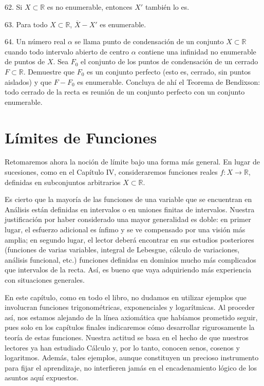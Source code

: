 \documentclass[12pt,oneside]{book}
\begin{document}
62. Si \(X \subset \mathbb{R}\) es no enumerable, entonces \(X'\) también lo es.

63. Para todo \(X \subset \mathbb{R}\), \(\overline{X} - X'\) es enumerable.

64. Un número real \(\alpha\) se llama punto de condensación de un conjunto \(X \subset \mathbb{R}\) cuando todo intervalo abierto de centro \(\alpha\) contiene una infinidad no enumerable de puntos de \(X\). Sea \(F_0\) el conjunto de los puntos de condensación de un cerrado \(F \subset \mathbb{R}\). Demuestre que \(F_0\) es un conjunto perfecto (esto es, cerrado, sin puntos aislados) y que \(F - F_0\) es enumerable. Concluya de ahí el Teorema de Bendixson: todo cerrado de la recta es reunión de un conjunto perfecto con un conjunto enumerable.

\newpage

\chapter{Límites de Funciones}

Retomaremos ahora la noción de límite bajo una forma más general. En lugar de sucesiones, como en el Capítulo IV, consideraremos funciones reales \( f: X \to \mathbb{R} \), definidas en subconjuntos arbitrarios \( X \subset \mathbb{R} \).

Es cierto que la mayoría de las funciones de una variable que se encuentran en Análisis están definidas en intervalos o en uniones finitas de intervalos. Nuestra justificación por haber considerado una mayor generalidad es doble: en primer lugar, el esfuerzo adicional es ínfimo y se ve compensado por una visión más amplia; en segundo lugar, el lector deberá encontrar en sus estudios posteriores (funciones de varias variables, integral de Lebesgue, cálculo de variaciones, análisis funcional, etc.) funciones definidas en dominios mucho más complicados que intervalos de la recta. Así, es bueno que vaya adquiriendo más experiencia con situaciones generales.

En este capítulo, como en todo el libro, no dudamos en utilizar ejemplos que involucran funciones trigonométricas, exponenciales y logarítmicas. Al proceder así, nos estamos alejando de la línea axiomática que habíamos prometido seguir, pues solo en los capítulos finales indicaremos cómo desarrollar rigurosamente la teoría de estas funciones. Nuestra actitud se basa en el hecho de que nuestros lectores ya han estudiado Cálculo y, por lo tanto, conocen senos, cosenos y logaritmos. Además, tales ejemplos, aunque constituyen un precioso instrumento para fijar el aprendizaje, no interfieren jamás en el encadenamiento lógico de los asuntos aquí expuestos.
\end{document}
